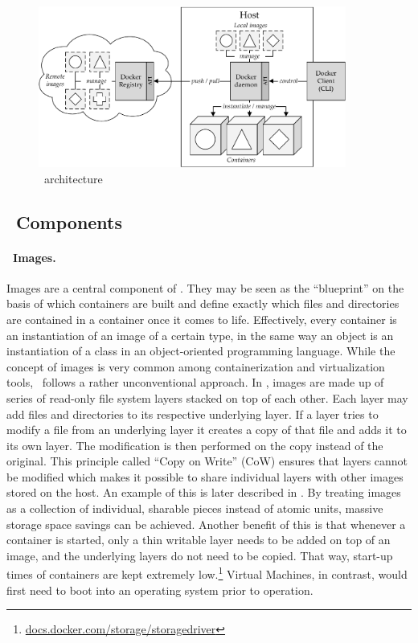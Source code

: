 \begin{figure}[htpb]
  \centering
  \includegraphics[width=0.9\textwidth]{figures/docker-arch.pdf}
  \caption[\docker\ architecture]{\docker\ architecture}\label{fig:docker-arch}
\end{figure}

\subsection{\docker\ Components}
\paragraph{\docker\ Images.}
Images are a central component of \docker . They may be seen as the ``blueprint'' on the basis of which containers are built and define exactly which files and directories are contained in a container once it comes to life. Effectively, every container is an instantiation of an image of a certain type, in the same way an object is an instantiation of a class in an object-oriented programming language. While the concept of images is very common among containerization and virtualization tools, \docker\ follows a rather unconventional approach.
In \docker , images are made up of series of read-only file system layers stacked on top of each other. Each layer may add files and directories to its respective underlying layer. If a layer tries to modify a file from an underlying layer it creates a copy of that file and adds it to its own layer. The modification is then performed on the copy instead of the original. This principle called ``Copy on Write'' (CoW) ensures that layers cannot be modified which makes it possible to share individual layers with other images stored on the host. An example of this is later described in . By treating images as a collection of individual, sharable pieces instead of atomic units, massive storage space savings can be achieved. Another benefit of this is that whenever a container is started, only a thin writable layer needs to be added on top of an image, and the underlying layers do not need to be copied. That way, start-up times of containers are kept extremely low.\footnote{\url{docs.docker.com/storage/storagedriver}}  Virtual Machines, in contrast, would first need to boot into an operating system prior to operation.

